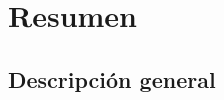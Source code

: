 \begingroup
\let\clearpage\relax
\let\cleardoublepage\relax
\let\cleardoublepage\relax

\chapter*{Resumen}


\section*{Descripción general}

